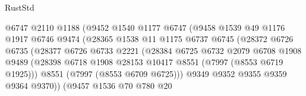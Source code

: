 \begin{lexlean}{RustStd}
\begin{coremodule}
                                  @6747
                                  @2110
                                  @1188
                                  (@9452
                                    @1540
                                    @1177
                                    @6747
                                    (@9458
                                      @1539
                                      @49
                                      @1176
                                      @1917
                                      @6746
                                      @9474
                                      (@28365
                                        @1538
                                        @11
                                        @1175
                                        @6737
                                        @6745
                                        (@28372
                                          @6726
                                          @6735
                                          (@28377
                                            @6726
                                            @6733
                                            @2221
                                            (@28384
                                              @6725
                                              @6732
                                              @2079
                                              @6708
                                              @1908
                                              @9489
                                              (@28398
                                                @6718
                                                @1908
                                                @28153
                                                @10417
                                                @8551
                                                (@7997 (@8553 @6719 @1925)))
                                              @8551
                                              (@7997 (@8553 @6709 @6725)))
                                            @9349
                                            @9352
                                            @9355
                                            @9359
                                            @9364
                                            @9370))
                                        (@9457
                                          @1536
                                          @70
                                          @780
                                          @20

\end{coremodule}
\end{lexlean}
